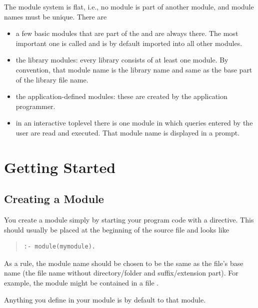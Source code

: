 The module system is flat, i.e., no module is part of another module,
and module names must be unique. There are
\begin{itemize}
   \item a few basic modules that are part of the {\eclipse}
      and are always there. The most important one is
     called  and is by default imported
     into all other modules.
   \item the library modules: every library consists of at least one
     module. By convention, that module name is the library name
     and same as the base part of the library file name.
   \item the application-defined modules: these are created by the
     application programmer.
   \item in an interactive {\eclipse} toplevel there is one module
     in which queries entered by the user are read and executed.
     That module name is displayed in a prompt.
\end{itemize}


\section{Getting Started}
\subsection{Creating a Module}

You create a module simply by starting your program code with a
directive.  This should usually be placed at the beginning of the source file
and looks like
\begin{quote}
\begin{verbatim}
:- module(mymodule).
\end{verbatim}
\end{quote}
As a rule, the module name should be chosen to be the same as the
file's base name (the file name without directory/folder and
suffix/extension part). For example, the module  might be
contained in a file .

Anything you define in your module is by default  to that
module.


